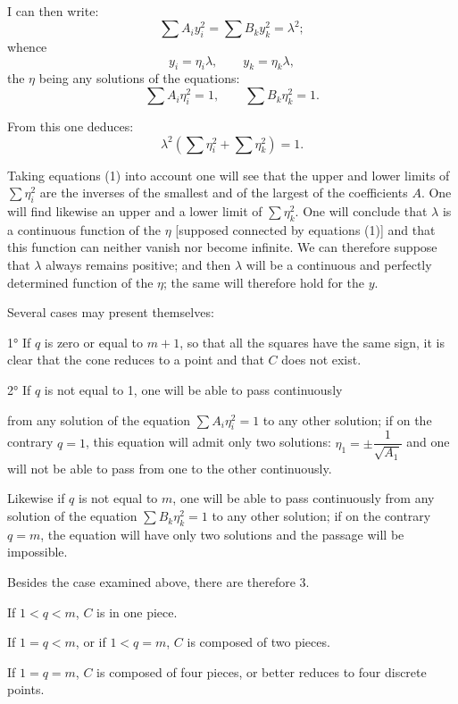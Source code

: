 \documentclass{article}
\begin{document}
I can then write:
\[ \sum A_{i} y^{2}_{i} = \sum B_{k} y^{2}_{k} = \lambda^{2}; \]
whence
\[ y_{i} = \eta_{i} \lambda, \qquad y_{k} = \eta_{k} \lambda, \]
the $\eta$ being any solutions of the equations:
\[ \sum A_{i} \eta^{2}_{i} = 1, \qquad \sum B_{k} \eta^{2}_{k} = 1. \tag{1} \]

From this one deduces:
\[ \lambda^{2}\left(\sum \eta^{2}_{i} + \sum \eta^{2}_{k}\right) = 1. \]

Taking equations (1) into account one will see that the upper and lower limits of $\displaystyle\sum \eta^{2}_{i}$ are the inverses of the smallest and of the largest of the coefficients $A$. One will find likewise an upper and a lower limit of $\displaystyle\sum \eta^{2}_{k}$. One will conclude that $\lambda$ is a continuous function of the $\eta$ [supposed connected by equations (1)] and that this function can neither vanish nor become infinite. We can therefore suppose that $\lambda$ always remains positive; and then $\lambda$ will be a continuous and perfectly determined function of the $\eta$; the same will therefore hold for the $y$.

Several cases may present themselves:

1° If $q$ is zero or equal to $m + 1$, so that all the squares have the same sign, it is clear that the cone reduces to a point and that $C$ does not exist.

2° If $q$ is not equal to 1, one will be able to pass continuously

from any solution of the equation $\displaystyle\sum A_{i} \eta^{2}_{i} = 1$ to any other solution; if on the contrary $q = 1$, this equation will admit only two solutions: $\eta_{1} = \pm \dfrac{1}{\sqrt{A_{1}}}$ and one will not be able to pass from one to the other continuously.

Likewise if $q$ is not equal to $m$, one will be able to pass continuously from any solution of the equation $\displaystyle\sum B_{k} \eta^{2}_{k} = 1$ to any other solution; if on the contrary $q = m$, the equation will have only two solutions and the passage will be impossible.

Besides the case examined above, there are therefore 3.

If $1 < q < m$, $C$ is in one piece.

If $1 = q < m$, or if $1 < q = m$, $C$ is composed of two pieces.

If $1 = q = m$, $C$ is composed of four pieces, or better reduces to four discrete points.
\end{document}
